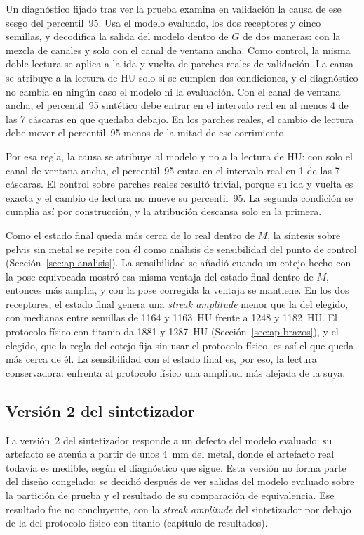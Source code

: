 Un diagnóstico fijado tras ver la prueba examina en validación la causa de ese sesgo del percentil~95. Usa el modelo evaluado, los dos receptores y cinco semillas, y decodifica la salida del modelo dentro de $G$ de dos maneras: con la mezcla de canales y solo con el canal de ventana ancha. Como control, la misma doble lectura se aplica a la ida y vuelta de parches reales de validación. La causa se atribuye a la lectura de HU solo si se cumplen dos condiciones, y el diagnóstico no cambia en ningún caso el modelo ni la evaluación. Con el canal de ventana ancha, el percentil~95 sintético debe entrar en el intervalo real en al menos 4 de las 7 cáscaras en que quedaba debajo. En los parches reales, el cambio de lectura debe mover el percentil~95 menos de la mitad de ese corrimiento.

Por esa regla, la causa se atribuye al modelo y no a la lectura de HU: con solo el canal de ventana ancha, el percentil~95 entra en el intervalo real en 1 de las 7 cáscaras. El control sobre parches reales resultó trivial, porque su ida y vuelta es exacta y el cambio de lectura no mueve su percentil~95. La segunda condición se cumplía así por construcción, y la atribución descansa solo en la primera.

Como el estado final queda más cerca de lo real dentro de $M$, la síntesis sobre pelvis sin metal se repite con él como análisis de sensibilidad del punto de control (Sección~\ref{sec:ap-analisis}). La sensibilidad se añadió cuando un cotejo hecho con la pose equivocada mostró esa misma ventaja del estado final dentro de $M$, entonces más amplia, y con la pose corregida la ventaja se mantiene. En los dos receptores, el estado final genera una \emph{streak amplitude} menor que la del elegido, con medianas entre semillas de 1164 y 1163~HU frente a 1248 y 1182~HU. El protocolo físico con titanio da 1881 y 1287~HU (Sección~\ref{sec:ap-brazos}), y el elegido, que la regla del cotejo fija sin usar el protocolo físico, es así el que queda más cerca de él. La sensibilidad con el estado final es, por eso, la lectura conservadora: enfrenta al protocolo físico una amplitud más alejada de la suya.

\subsection{Versión 2 del sintetizador}\label{sec:v2}

La versión~2 del sintetizador responde a un defecto del modelo evaluado: su artefacto se atenúa a partir de unos 4~mm del metal, donde el artefacto real todavía es medible, según el diagnóstico que sigue. Esta versión no forma parte del diseño congelado: se decidió después de ver salidas del modelo evaluado sobre la partición de prueba y el resultado de su comparación de equivalencia. Ese resultado fue no concluyente, con la \emph{streak amplitude} del sintetizador por debajo de la del protocolo físico con titanio (capítulo de resultados).

